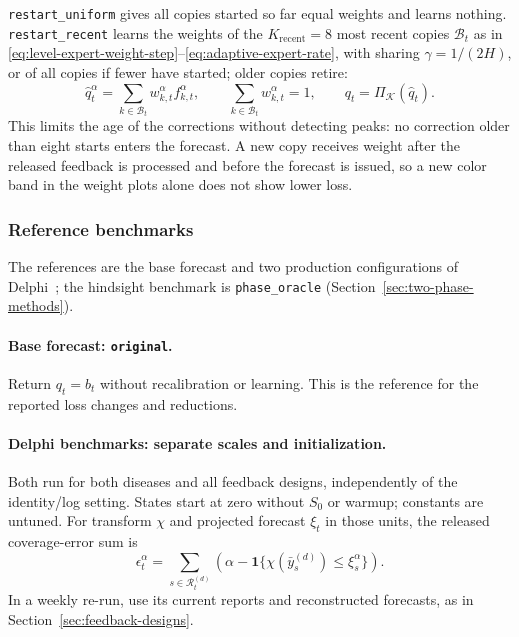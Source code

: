 \documentclass[11pt,a4paper]{article}
\newcommand{\K}{\mathcal{K}}
\newcommand{\ind}{\mathbf{1}}
\theoremstyle{definition}
\theoremstyle{remark}
\begin{document}
\texttt{restart\_uniform} gives all copies started so far equal weights
and learns nothing. \texttt{restart\_\allowbreak recent} learns the weights of the
$K_{\mathrm{recent}}=8$ most recent copies $\mathcal B_t$ as in
\eqref{eq:level-expert-weight-step}--\eqref{eq:adaptive-expert-rate},
with sharing $\gamma=1/(2H)$, or of all copies if fewer have started;
older copies retire:
\begin{equation}
 \hat q_t^\alpha=\sum_{k\in\mathcal B_t}w_{k,t}^\alpha f_{k,t}^\alpha,
 \qquad\sum_{k\in\mathcal B_t}w_{k,t}^\alpha=1,
 \qquad q_t=\Pi_\K(\hat q_t).
 \label{eq:recent-start-mixture}
\end{equation}
This limits the age of the corrections without detecting peaks: no
correction older than eight starts enters the forecast. A new copy
receives weight after the released feedback is processed and before the
forecast is issued, so a new color band in the weight plots alone does
not show lower loss.

\setcounter{secnumdepth}{3}

\subsubsection{Reference benchmarks}
\label{sec:reference-benchmarks}
The references are the base forecast and two production configurations
of Delphi~\cite{delphi-calibration}; the hindsight benchmark is
\texttt{phase\_oracle} (Section~\ref{sec:two-phase-methods}).

\paragraph{Base forecast: \texttt{original}.}
Return $q_t=b_t$ without recalibration or learning. This is the reference
for the reported loss changes and reductions.

\paragraph{Delphi benchmarks: separate scales and initialization.}
Both run for both diseases and all feedback designs, independently of
the identity/log setting. States start at zero without $S_0$ or warmup;
constants are untuned. For transform $\chi$ and projected forecast
$\xi_t$ in those units, the released coverage-error sum is
\begin{equation}
 \epsilon_t^\alpha=
 \sum_{s\in\mathcal R_t^{(d)}}
 \left(\alpha-\ind\{\chi(\bar y_s^{(d)})\le\xi_s^\alpha\}\right).
 \label{eq:sqrt-feedback-errors}
\end{equation}
In a weekly re-run, use its current reports and reconstructed forecasts,
as in Section~\ref{sec:feedback-designs}.
\end{document}

